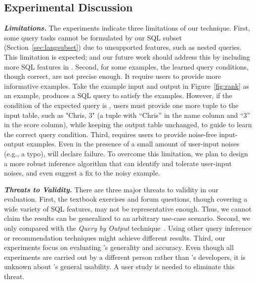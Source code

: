 \vspace{-1mm}
\subsection{Experimental Discussion}
\vspace{-1mm}

\enlargethispage{5pt}

\noindent \textbf{\textit{Limitations.}}
The experiments indicate three limitations
of our technique. First, some query tasks
cannot be formulated by our SQL subset (Section~\ref{sec:langsubset})
due to unsupported features, such as
nested queries. This limitation is expected;
and our future work
should address this by including more SQL
features in \ourtool.
Second, for some examples, the learned query
conditions, though correct, are not precise
enough. It require users to provide more informative examples.
Take the example input and output in Figure~\ref{fig:rank}
as an example, \ourtool produces a SQL
query 
to satisfy the examples. However, if
the condition of the expected query
is , users must provide
one more tuple to the input table, such as "Chris, 3"
(a tuple with ``Chris'' in the name column and ``3''
in the score column), while keeping the output table
unchanged, 
to guide \ourtool to learn the correct query condition.
Third, \ourtool requires
users to provide noise-free input-output examples.
Even in the presence of a small amount of user-input
noises (e.g., a typo), \ourtool will declare failure.
To overcome this limitation, we plan to design a more
robust inference algorithm that can identify
and tolerate user-input noises, and even suggest a fix
to the noisy example.

\vspace{.5mm}
\noindent \textbf{\textit{Threats to Validity.}}
There are three major threats to validity
in our evaluation. First, the \exnum textbook exercises
and \pnum forum questions, though covering
a wide variety of SQL features, may not be representative enough.
Thus, we cannot claim the results can be generalized to an
arbitrary use-case scenario. Second, we only compared
\ourtool with the \textit{Query by Output} technique~\cite{Tran:2009}.
Using other query inference or recommendation techniques
might achieve different results. Third, our
experiments focus on evaluating \ourtool's generality 
and accuracy. Even though all experiments are carried
out by a different person rather than \ourtool's developers,
it is unknown about \ourtool's general usability.
A user study is needed to eliminate this threat.


